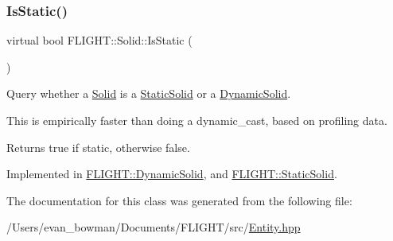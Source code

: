 \subsubsection{\texorpdfstring{Is\+Static()}{IsStatic()}}
{\footnotesize\ttfamily virtual bool F\+L\+I\+G\+H\+T\+::\+Solid\+::\+Is\+Static (\begin{DoxyParamCaption}{ }\end{DoxyParamCaption})\hspace{0.3cm}{\ttfamily [pure virtual]}}



Query whether a \hyperlink{class_f_l_i_g_h_t_1_1_solid}{Solid} is a \hyperlink{class_f_l_i_g_h_t_1_1_static_solid}{Static\+Solid} or a \hyperlink{class_f_l_i_g_h_t_1_1_dynamic_solid}{Dynamic\+Solid}. 

This is empirically faster than doing a dynamic\+\_\+cast, based on profiling data. \begin{DoxyReturn}{Returns}
true if static, otherwise false. 
\end{DoxyReturn}


Implemented in \hyperlink{class_f_l_i_g_h_t_1_1_dynamic_solid_a39451b0ef449a343cf5f9c12e3f79ba3}{F\+L\+I\+G\+H\+T\+::\+Dynamic\+Solid}, and \hyperlink{class_f_l_i_g_h_t_1_1_static_solid_ae810b48d76acce73364e6b714a77f4cd}{F\+L\+I\+G\+H\+T\+::\+Static\+Solid}.



The documentation for this class was generated from the following file\+:\begin{DoxyCompactItemize}
\item 
/\+Users/evan\+\_\+bowman/\+Documents/\+F\+L\+I\+G\+H\+T/src/\hyperlink{_entity_8hpp}{Entity.\+hpp}\end{DoxyCompactItemize}
